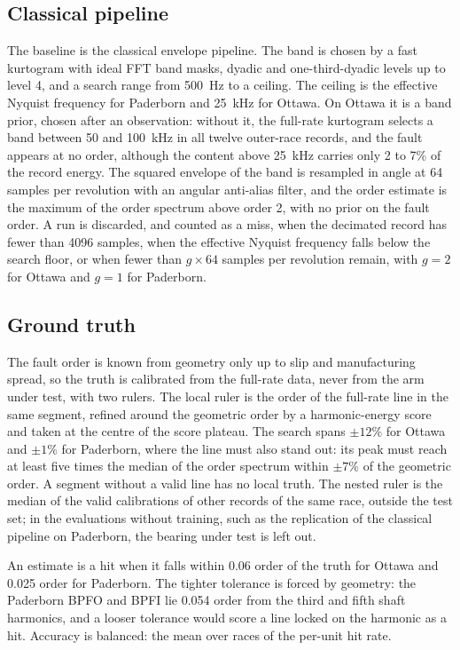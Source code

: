 \subsection{Classical pipeline}
\label{sec:pipeline}

The baseline is the classical envelope pipeline. The band is chosen by a fast kurtogram
\citep{antoni2007kurtogram} with ideal FFT band masks, dyadic and one-third-dyadic levels up to
level 4, and a search range from 500~Hz to a ceiling. The ceiling is the effective Nyquist
frequency for Paderborn and 25~kHz for Ottawa. On Ottawa it is a band prior, chosen after an
observation: without it, the full-rate kurtogram selects a band between 50 and 100~kHz in all
twelve outer-race records, and the fault appears at no order, although the content above 25~kHz
carries only 2 to 7\% of the record energy. The squared envelope of the
band is resampled in angle at 64 samples per revolution with an angular anti-alias filter, and the
order estimate is the maximum of the order spectrum above order 2, with no prior on the fault
order. A run is discarded, and counted as a miss, when the decimated record has fewer than 4096
samples, when the effective Nyquist frequency falls below the search floor, or when fewer than
$g \times 64$ samples per revolution remain, with $g = 2$ for Ottawa and $g = 1$ for Paderborn.

\subsection{Ground truth}
\label{sec:truth}

The fault order is known from geometry only up to slip and manufacturing spread, so the truth is
calibrated from the full-rate data, never from the arm under test, with two rulers. The local ruler
is the order of the full-rate line in the same segment, refined around the geometric order by a
harmonic-energy score and taken at the centre of the score plateau. The search spans $\pm12\%$ for
Ottawa and $\pm1\%$ for Paderborn, where the line must also stand out: its peak must reach at least
five times the median of the order spectrum within $\pm7\%$ of the geometric order. A segment
without a valid line has no local truth. The nested ruler is the median of the valid calibrations
of other records of the same race, outside the test set; in the evaluations without training, such
as the replication of the classical pipeline on Paderborn, the bearing under test is left out.

An estimate is a hit when it falls within 0.06 order of the truth for Ottawa and 0.025 order for
Paderborn. The tighter tolerance is forced by geometry: the Paderborn BPFO and BPFI lie 0.054 order
from the third and fifth shaft harmonics, and a looser tolerance would score a line locked on the
harmonic as a hit. Accuracy is balanced: the mean over races of the per-unit hit rate.


